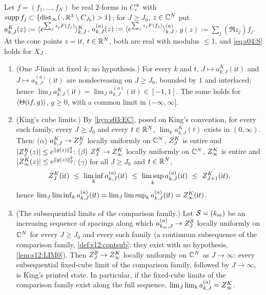 \begin{corollary}\label{cor:s04:G2}
Let $f=(f_1,\dots,f_N)$ be real $2$-forms in $C^\infty_c$ with $\operatorname{supp} f_j\subset\{\operatorname{dist}_\infty(\cdot,\mathbb R^3\setminus C_{J_0})>1\}$; for $J\ge J_0$, $z\in\mathbb C^N$ put $a^K_{k,J}(z):=\langle e^{\sum_jz_jF(f_j)}\rangle^{K}_{k,J}$, $a^{(a)}_{k,J}(z):=\langle e^{\sum_jz_jF(f_j)}\rangle^{(a)}_{k,J}$, $g(z):=\sum_j(\Re z_j)f_j$. At the cone points $z=\mathrm it$, $t\in\mathbb R^N$, both are real with modulus $\le1$, and \eqref{eq:s04:S} holds for $X_J$.
\begin{enumerate}[label=\textup{(\roman*)},leftmargin=*]
\item \textup{(One $J$-limit at fixed $k$; no hypothesis.)} For every $k$ and $t$, $J\mapsto a^K_{k,J}(\mathrm it)$ and $J\mapsto a^{(a)}_{k,J}(\mathrm it)$ are nondecreasing on $J\ge J_0$, bounded by $1$ and interlaced; hence $\lim_Ja^K_{k,J}(\mathrm it)=\lim_Ja^{(a)}_{k,J}(\mathrm it)\in[-1,1]$. The same holds for $\langle \Theta(\mathrm if,g)\rangle$, $g\ge0$, with a common limit in $(-\infty,\infty]$.
\item \textup{(King's cube limits.)} By \cref{hyp:s03:EC}, posed on King's convention, for every such family, every $J\ge J_0$ and every $t\in\mathbb R^N$, $\lim_ka^K_{k,J}(t)$ exists in $(0,\infty)$. Then: ($\alpha$) $a^K_{k,J}\to Z^{K}_{J}$ locally uniformly on $\mathbb C^N$, $Z^{K}_{J}$ is entire and $|Z^{K}_{J}(z)|\le e^{\lVert g(z)\rVert_2^2}$; ($\beta$) $Z^{K}_{J}\to Z^{K}_{\infty}$ locally uniformly on $\mathbb C^N$, $Z^{K}_{\infty}$ is entire and $|Z^{K}_{\infty}(z)|\le e^{\lVert g(z)\rVert_2^2}$; ($\gamma$) for all $J\ge J_0$ and $t\in\mathbb R^N$,
\[
\ZKJ(\mathrm it)\ \le\ \liminf_ka^{(a)}_{k,J}(\mathrm it)\ \le\ \limsup_ka^{(a)}_{k,J}(\mathrm it)\ \le\ Z^K_{J+1}(\mathrm it),
\]
hence $\lim_J\liminf_ka^{(a)}_{k,J}(\mathrm it)=\lim_J\limsup_ka^{(a)}_{k,J}(\mathrm it)=Z^{K}_{\infty}(\mathrm it)$.
\item \textup{(The subsequential limits of the comparison family.)} Let $\mathcal S=(k_m)$ be an increasing sequence of spacings along which $a^{(a)}_{k_m,J}\to Z^{\mathcal S}_J$ locally uniformly on $\mathbb C^N$ for every $J\ge J_0$ and every such family (a continuum subsequence of the comparison family, \cref{def:s12:contsub}; they exist with no hypothesis, \cref{lem:s12:LIM0}). Then $Z^{\mathcal S}_J\to Z^{K}_{\infty}$ locally uniformly on $\mathbb C^N$ as $J\to\infty$: every subsequential fixed-cube limit of the comparison family, followed by $J\to\infty$, is King's printed state. In particular, if the fixed-cube limits of the comparison family exist along the full sequence, $\lim_J\lim_ka^{(a)}_{k,J}=Z^{K}_{\infty}$.
\end{enumerate}
\end{corollary}

